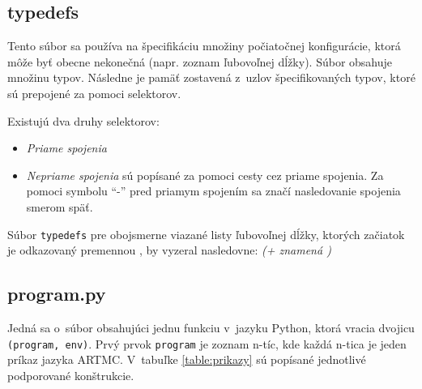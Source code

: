 \subsection{typedefs}
Tento súbor sa používa na špecifikáciu množiny počiatočnej konfigurácie, ktorá môže byť obecne nekonečná (napr. zoznam ľubovoľnej dĺžky). Súbor obsahuje množinu typov. Následne je pamäť zostavená z~uzlov špecifikovaných typov, ktoré sú prepojené za pomoci selektorov.
\newpage

Existujú dva druhy selektorov:
\begin{itemize}
\item \textit{Priame spojenia}
\item \textit{Nepriame spojenia} sú popísané za pomoci cesty cez priame spojenia. Za pomoci symbolu ``-'' pred priamym spojením sa značí nasledovanie spojenia smerom späť.
\end{itemize}

Súbor \texttt{typedefs} pre obojsmerne viazané listy ľubovoľnej dĺžky, ktorých začiatok je odkazovaný premennou , by vyzeral nasledovne: \textit{(+ znamená )}


\subsection{program.py}
Jedná sa o~súbor obsahujúci jednu funkciu v~jazyku Python, ktorá vracia dvojicu \texttt{(program, env)}.
Prvý prvok \texttt{program} je zoznam n-tíc, kde každá n-tica je jeden príkaz jazyka ARTMC. V~tabuľke \ref{table:prikazy} sú popísané jednotlivé podporované konštrukcie.


